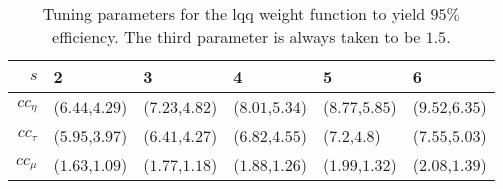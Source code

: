 \begin{table}[htbp!]
\begin{center}
{\small
\begin{tabular}{rlllll}
   \hline
$s$ & 2 & 3 & 4 & 5 & 6 \\ 
   \hline
$cc_\eta$ & ($6.44$,$4.29$) & ($7.23$,$4.82$) & ($8.01$,$5.34$) & ($8.77$,$5.85$) & ($9.52$,$6.35$) \\ 
  $cc_\tau$ & ($5.95$,$3.97$) & ($6.41$,$4.27$) & ($6.82$,$4.55$) & ($7.2$,$4.8$) & ($7.55$,$5.03$) \\ 
  $cc_\mu$ & ($1.63$,$1.09$) & ($1.77$,$1.18$) & ($1.88$,$1.26$) & ($1.99$,$1.32$) & ($2.08$,$1.39$) \\ 
   \hline
\end{tabular}
}
\caption{Tuning parameters for the lqq weight function to yield $95\%$ efficiency. The third parameter is always taken to be $1.5$.}
\label{tab:effLqq}
\end{center}
\end{table}
